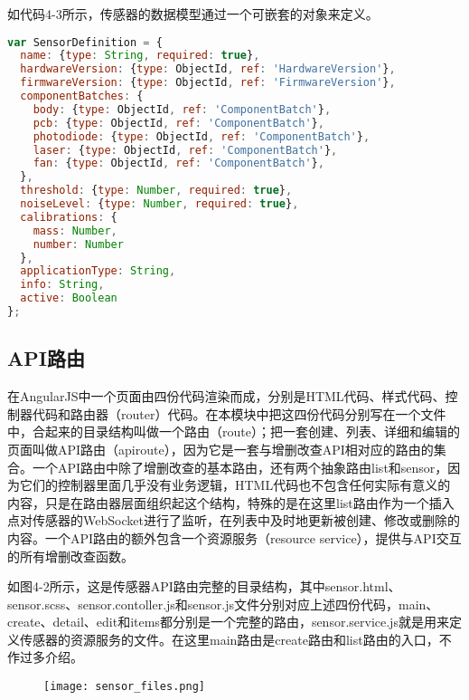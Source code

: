 如代码4-3所示，传感器的数据模型通过一个可嵌套的对象来定义。
\begin{lstlisting}[language={JavaScript}, caption={传感器的Mongoose数据模型}]
var SensorDefinition = {
  name: {type: String, required: true},
  hardwareVersion: {type: ObjectId, ref: 'HardwareVersion'},
  firmwareVersion: {type: ObjectId, ref: 'FirmwareVersion'},
  componentBatches: {
    body: {type: ObjectId, ref: 'ComponentBatch'},
    pcb: {type: ObjectId, ref: 'ComponentBatch'},
    photodiode: {type: ObjectId, ref: 'ComponentBatch'},
    laser: {type: ObjectId, ref: 'ComponentBatch'},
    fan: {type: ObjectId, ref: 'ComponentBatch'},
  },
  threshold: {type: Number, required: true},
  noiseLevel: {type: Number, required: true},
  calibrations: {
    mass: Number,
    number: Number
  },
  applicationType: String,
  info: String,
  active: Boolean
};
\end{lstlisting}
\subsection{API路由}
在AngularJS中一个页面由四份代码渲染而成，分别是HTML代码、样式代码、控制器代码和路由器（router）代码。在本模块中把这四份代码分别写在一个文件中，合起来的目录结构叫做一个路由（route）；把一套创建、列表、详细和编辑的页面叫做API路由（apiroute），因为它是一套与增删改查API相对应的路由的集合。一个API路由中除了增删改查的基本路由，还有两个抽象路由list和sensor，因为它们的控制器里面几乎没有业务逻辑，HTML代码也不包含任何实际有意义的内容，只是在路由器层面组织起这个结构，特殊的是在这里list路由作为一个插入点对传感器的WebSocket进行了监听，在列表中及时地更新被创建、修改或删除的内容。一个API路由的额外包含一个资源服务（resource service），提供与API交互的所有增删改查函数。

如图4-2所示，这是传感器API路由完整的目录结构，其中sensor.html、sensor.scss、sensor.contoller.js和sensor.js文件分别对应上述四份代码，main、create、detail、edit和items都分别是一个完整的路由，sensor.service.js就是用来定义传感器的资源服务的文件。在这里main路由是create路由和list路由的入口，不作过多介绍。
\begin{figure}[H]
 \centering
 \texttt{[image: sensor\_files.png]}
\end{figure}

